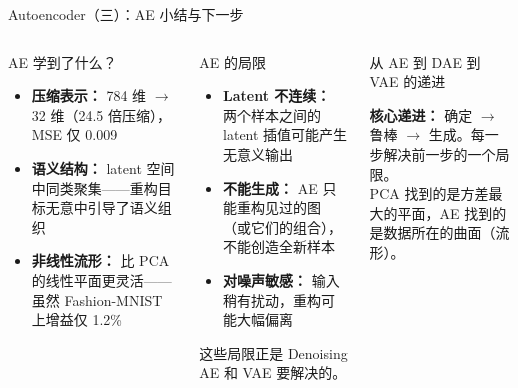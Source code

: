 \documentclass[aspectratio=169]{ctexbeamer}
\begin{document}
\begin{frame}[shrink=10]{Autoencoder（三）：AE 小结与下一步}
\small

\begin{columns}[T]
\begin{block}{AE 学到了什么？}
\footnotesize
\begin{itemize}
  \item \textbf{压缩表示：} 784 维 $\to$ 32 维（24.5 倍压缩），MSE 仅 0.009
  \item \textbf{语义结构：} latent 空间中同类聚集——重构目标无意中引导了语义组织
  \item \textbf{非线性流形：} 比 PCA 的线性平面更灵活——虽然 Fashion-MNIST 上增益仅 1.2\%
\end{itemize}
\end{block}

\vspace{0.1cm}

\begin{block}{AE 的局限}
\footnotesize
\begin{itemize}
  \item \textbf{Latent 不连续：} 两个样本之间的 latent 插值可能产生无意义输出
  \item \textbf{不能生成：} AE 只能重构见过的图（或它们的组合），不能创造全新样本
  \item \textbf{对噪声敏感：} 输入稍有扰动，重构可能大幅偏离
\end{itemize}

这些局限正是 Denoising AE 和 VAE 要解决的。
\end{block}

\begin{alertblock}{从 AE 到 DAE 到 VAE 的递进}
\footnotesize
\begin{center}
\end{center}
\vspace{0.1cm}
\textbf{核心递进：} 确定 $\to$ 鲁棒 $\to$ 生成。每一步解决前一步的一个局限。\\
PCA 找到的是方差最大的平面，AE 找到的是数据所在的曲面（流形）。
\end{alertblock}
\end{columns}
\end{frame}
\end{document}
